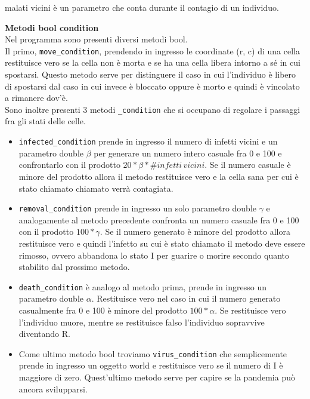 \documentclass{article}
\begin{document}
\begin{enumerate}
{    malati vicini è un parametro che conta durante il contagio di un individuo. 
    \item \textbf{Metodi bool condition}\\
    Nel programma sono presenti diversi metodi bool. \\
    Il primo, \verb|move_condition|, prendendo in ingresso le coordinate (r, c) di una 
    cella restituisce vero se la cella non è morta e se ha una cella libera intorno a 
    sé in cui spostarsi. Questo metodo serve per distinguere il caso in cui l'individuo 
    è libero di spostarsi dal caso in cui invece è bloccato oppure è morto e quindi è 
    vincolato a rimanere dov'è. \\
    Sono inoltre presenti 3 metodi \verb|_condition| che si occupano di regolare i 
    passaggi fra gli stati delle celle. 
    \begin{itemize}
        \item \verb|infected_condition| prende in ingresso il numero di infetti vicini 
        e un parametro double $\beta$ per generare un numero intero casuale fra 0 e 100 
        e confrontarlo con il prodotto $20*\beta*\# infetti\, vicini$. Se il numero 
        casuale è minore del prodotto allora il metodo restituisce vero e la cella 
        sana per cui è stato chiamato chiamato verrà contagiata. 
        \item \verb|removal_condition| prende in ingresso un solo parametro double 
        $\gamma$ e analogamente al metodo precedente confronta un numero casuale fra 0 
        e 100 con il prodotto $100 *\gamma$. 
        Se il numero generato è minore del prodotto allora restituisce vero e quindi 
        l'infetto su cui è stato chiamato il metodo deve essere rimosso, ovvero 
        abbandona lo stato I per guarire o morire secondo quanto stabilito dal 
        prossimo metodo. 
        \item \verb|death_condition| è analogo al metodo prima, prende in ingresso un 
        parametro double $\alpha$. 
        Restituisce vero nel caso in cui il numero generato casualmente fra 0 e 100 
        è minore del prodotto $100 * \alpha$. Se restituisce vero l'individuo muore, 
        mentre se restituisce falso l'individuo sopravvive diventando R. 
        \item Come ultimo metodo bool troviamo \verb|virus_condition| che semplicemente 
        prende in ingresso un oggetto world e restituisce vero se il numero di I 
        è maggiore di zero. 
        Quest'ultimo metodo serve per capire se la pandemia può ancora svilupparsi. 

\end{itemize}}
\end{enumerate}
\end{document}
